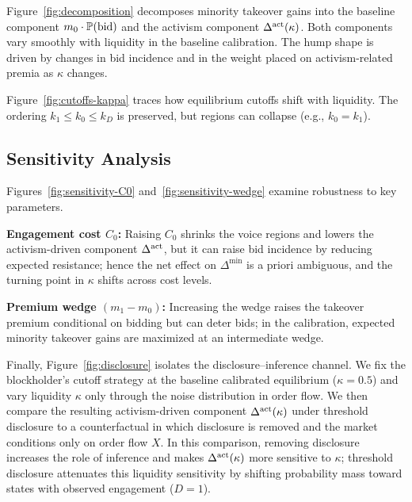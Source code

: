\documentclass[11pt]{article}
\newcommand{\PP}{\mathbb{P}}
\newcommand{\1}{\mathbf{1}}
\begin{document}
Figure~\ref{fig:decomposition} decomposes minority takeover gains into the baseline component $m_0 \cdot \PP(\textup{bid})$ and the activism component $\Delta^{\textup{act}}(\kappa)$. Both components vary smoothly with liquidity in the baseline calibration. The hump shape is driven by changes in bid incidence and in the weight placed on activism-related premia as $\kappa$ changes.

Figure~\ref{fig:cutoffs-kappa} traces how equilibrium cutoffs shift with liquidity. The ordering $k_1 \le k_0 \le k_D$ is preserved, but regions can collapse (e.g., $k_0=k_1$).

\subsection{Sensitivity Analysis}

Figures~\ref{fig:sensitivity-C0} and~\ref{fig:sensitivity-wedge} examine robustness to key parameters.

\textbf{Engagement cost $C_0$:} Raising $C_0$ shrinks the voice regions and lowers the activism-driven component $\Delta^{\textup{act}}$, but it can raise bid incidence by reducing expected resistance; hence the net effect on $\Delta^{\min}$ is a priori ambiguous, and the turning point in $\kappa$ shifts across cost levels.

\textbf{Premium wedge $(m_1 - m_0)$:} Increasing the wedge raises the takeover premium conditional on bidding but can deter bids; in the calibration, expected minority takeover gains are maximized at an intermediate wedge.

Finally, Figure~\ref{fig:disclosure} isolates the disclosure--inference channel. We fix the blockholder's cutoff strategy at the baseline calibrated equilibrium ($\kappa=0.5$) and vary liquidity $\kappa$ only through the noise distribution in order flow. We then compare the resulting activism-driven component $\Delta^{\textup{act}}(\kappa)$ under threshold disclosure to a counterfactual in which disclosure is removed and the market conditions only on order flow $X$. In this comparison, removing disclosure increases the role of inference and makes $\Delta^{\textup{act}}(\kappa)$ more sensitive to $\kappa$; threshold disclosure attenuates this liquidity sensitivity by shifting probability mass toward states with observed engagement ($D=1$).
\end{document}
